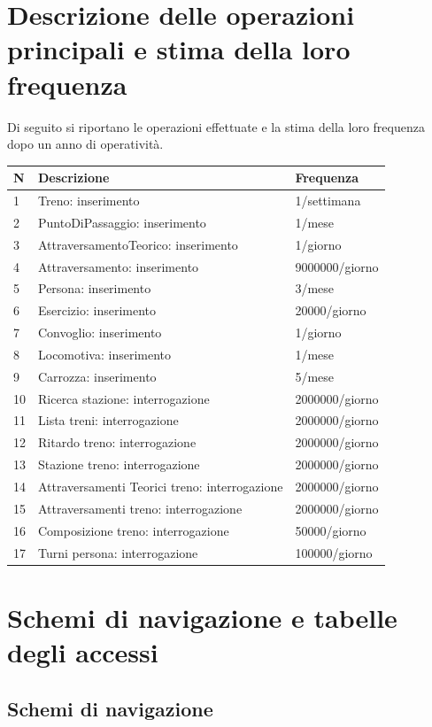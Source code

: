 \documentclass[a4paper,12pt]{report}
\begin{document}
	\section{Descrizione delle operazioni principali e stima della loro frequenza}
	Di seguito si riportano le operazioni effettuate e la stima della loro frequenza dopo un anno di operatività.
	\begin{table}[H]
	\centering
	\begin{tabular}{|l|l|l|}
		\hline N & Descrizione & Frequenza \\
		\hline 1 & Treno: inserimento & 1/settimana \\
		\hline 2 & PuntoDiPassaggio: inserimento & 1/mese \\
		\hline 3 & AttraversamentoTeorico: inserimento & 1/giorno \\
		\hline 4 & Attraversamento: inserimento & 9000000/giorno \\
		\hline 5 & Persona: inserimento & 3/mese \\
		\hline 6 & Esercizio: inserimento & 20000/giorno \\
		\hline 7 & Convoglio: inserimento & 1/giorno \\
		\hline 8 & Locomotiva: inserimento & 1/mese \\
		\hline 9 & Carrozza: inserimento & 5/mese \\
		\hline 10 & Ricerca stazione: interrogazione & 2000000/giorno \\
		\hline 11 & Lista treni: interrogazione & 2000000/giorno \\
		\hline 12 & Ritardo treno: interrogazione & 2000000/giorno \\
		\hline 13 & Stazione treno: interrogazione & 2000000/giorno \\
		\hline 14 & Attraversamenti Teorici treno: interrogazione & 2000000/giorno \\
		\hline 15 & Attraversamenti treno: interrogazione & 2000000/giorno \\
		\hline 16 & Composizione treno: interrogazione & 50000/giorno \\
		\hline 17 & Turni persona: interrogazione & 100000/giorno \\
		\hline
	\end{tabular}
	\end{table}
	\section{Schemi di navigazione e tabelle degli accessi}
	\subsection{Schemi di navigazione}
\end{document}
